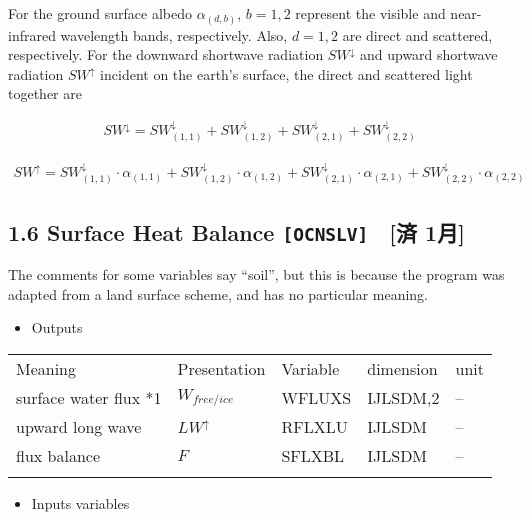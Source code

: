 For the ground surface albedo \(\alpha_{(d,b)}\), \(b=1,2\) represent
the visible and near-infrared wavelength bands, respectively. Also,
\(d=1,2\) are direct and scattered, respectively. For the downward
shortwave radiation \(SW^\downarrow\) and upward shortwave radiation
\(SW^\uparrow\) incident on the earth's surface, the direct and
scattered light together are

\begin{eqnarray}
    SW^\downarrow = SW^\downarrow_{(1,1)}+SW^\downarrow_{(1,2)}+SW^\downarrow_{(2,1)}+SW^\downarrow_{(2,2)}
\end{eqnarray}

\begin{eqnarray}
SW^\uparrow = SW^\downarrow_{(1,1)}\cdot\alpha_{(1,1)}+SW^\downarrow_{(1,2)}\cdot\alpha_{(1,2)}+SW^\downarrow_{(2,1)}\cdot\alpha_{(2,1)}+SW^\downarrow_{(2,2)}\cdot\alpha_{(2,2)}
\end{eqnarray}

\hypertarget{surface-heat-balance-ocnslv-ux6e08-1ux6708}{%
\subsection{\texorpdfstring{1.6 Surface Heat Balance
\texttt{{[}OCNSLV{]}}　{[}済
1月{]}}{1.6 Surface Heat Balance {[}OCNSLV{]}　{[}済 1月{]}}}\label{surface-heat-balance-ocnslv-ux6e08-1ux6708}}

The comments for some variables say ``soil'', but this is because the
program was adapted from a land surface scheme, and has no particular
meaning.

\begin{itemize}
\tightlist
\item
  Outputs
\end{itemize}

\setlength\LTleft{0pt}\setlength\LTright{0pt}\begin{longtable}[]{@{}lllll@{}}
\toprule\relax
Meaning & Presentation & Variable & dimension & unit \\ \addlinespace
\midrule\relax
\endhead
surface water flux *1 & \(W_{free/ice}\) & WFLUXS & IJLSDM,2 &
-- \\ \addlinespace
upward long wave & \(LW^\uparrow\) & RFLXLU & IJLSDM &
-- \\ \addlinespace
flux balance & \(F\) & SFLXBL & IJLSDM & -- \\ \addlinespace
\bottomrule
\end{longtable}

\begin{itemize}
\tightlist
\item
  Inputs variables
\end{itemize}

